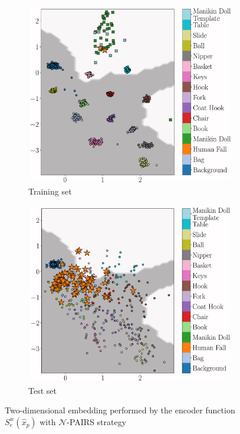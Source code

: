 \begin{figure}[h!]
	\centering
	\begin{subfigure}[b]{0.475\textwidth}   
		\centering 
		\includegraphics[width=\textwidth]{img/eeai/embedding/negative_template_pairs_only/fold_4_train}
		\caption[]%
		{Training set}    
		\label{fig:train-n-pairs}
	\end{subfigure}
	\quad
	\begin{subfigure}[b]{0.475\textwidth}   
		\centering 
		\includegraphics[width=\textwidth]{img/eeai/embedding/negative_template_pairs_only/fold_4_moquette}
		\caption[]%
		{Test set}    
		\label{fig:test-n-pairs}
	\end{subfigure}
	\caption[]
	{\small Two-dimensional embedding performed by the encoder function $S_e^w(\hat{x}_{p})$ with $\mathcal{N}$-PAIRS strategy} 
	\label{fig:n-pairs}
\end{figure}

